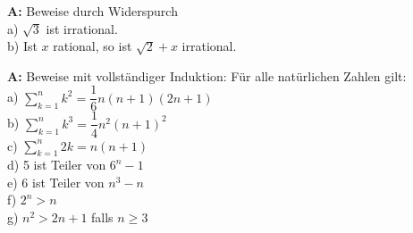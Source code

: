 \documentclass[landscape,twocolumn,a4paper]{article}
\begin{document}
\textbf{A:} Beweise durch Widerspurch \\
a) $\sqrt{3}$ ist irrational. \\
b) Ist $x$ rational, so ist $\sqrt{2} + x$ irrational.
\bigskip {}

\textbf{A:}
Beweise mit vollständiger Induktion: Für alle natürlichen Zahlen gilt: \\
a) $\sum\limits_{k=1}^n k^2 = \dfrac{1}{6}n(n+1)(2n+1)$ \\
b) $\sum\limits_{k=1}^n k^3 =   \dfrac{1}{4}n^2(n+1)^2$ \\
c)  $\sum\limits_{k=1}^n 2k =  n(n+1)$ \\
d) 5 ist Teiler von $6^n-1$ \\
e) 6 ist Teiler von $n^3-n$ \\
f) $2^n > n$ \\
g) $n^2 > 2n + 1$ falls $n \ge 3$
\bigskip {}
 
 

%
%
%
%
\end{document}
